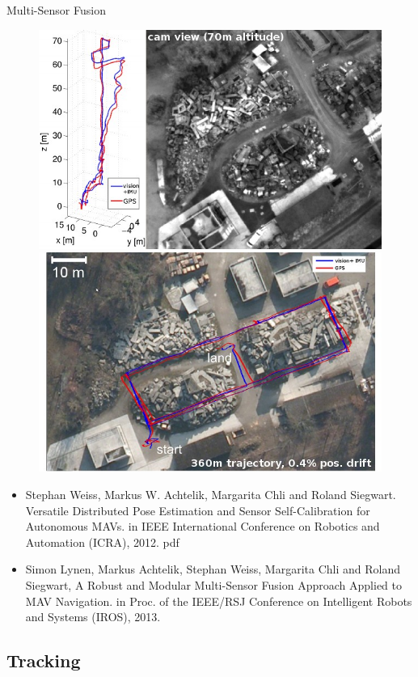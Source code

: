 \documentclass[14pt,hyperref={CJKbookmarks=true}]{beamer}
\theoremstyle{plain}
\theoremstyle{definition}
\theoremstyle{remark}
\begin{document}
\begin{frame}{Multi-Sensor Fusion}
\begin{figure}
\centering
\includegraphics[width=0.5\linewidth]{ethzasl_ptam_icarus.jpg}
\includegraphics[width=0.5\linewidth]{ethzasl_ptam_traj.jpg}
\end{figure}
\begin{itemize}\tiny
\item Stephan Weiss, Markus W. Achtelik, Margarita Chli and Roland Siegwart. Versatile Distributed Pose Estimation and Sensor Self-Calibration for Autonomous MAVs. in IEEE International Conference on Robotics and Automation (ICRA), 2012. pdf
\item Simon Lynen, Markus Achtelik, Stephan Weiss, Margarita Chli and Roland Siegwart, A Robust and Modular Multi-Sensor Fusion Approach Applied to MAV Navigation. in Proc. of the IEEE/RSJ Conference on Intelligent Robots and Systems (IROS), 2013.
\end{itemize}
\end{frame}



\subsection{Tracking}
\end{document}
